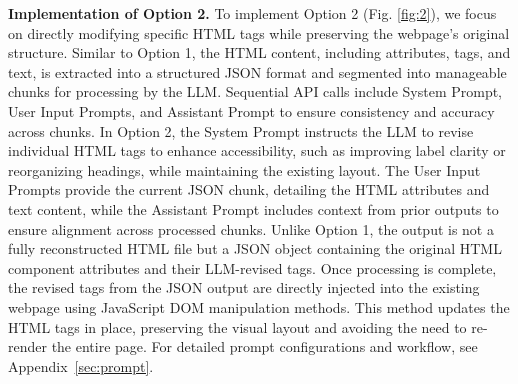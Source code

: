 \textbf{Implementation of Option 2.} To implement Option 2 (Fig. \ref{fig:2}), we focus on directly modifying specific HTML tags while preserving the webpage’s original structure. Similar to Option 1, the HTML content, including attributes, tags, and text, is extracted into a structured JSON format and segmented into manageable chunks for processing by the LLM. Sequential API calls include System Prompt, User Input Prompts, and Assistant Prompt to ensure consistency and accuracy across chunks. In Option 2, the System Prompt instructs the LLM to revise individual HTML tags to enhance accessibility, such as improving label clarity or reorganizing headings, while maintaining the existing layout. The User Input Prompts provide the current JSON chunk, detailing the HTML attributes and text content, while the Assistant Prompt includes context from prior outputs to ensure alignment across processed chunks. Unlike Option 1, the output is not a fully reconstructed HTML file but a JSON object containing the original HTML component attributes and their LLM-revised tags. Once processing is complete, the revised tags from the JSON output are directly injected into the existing webpage using JavaScript DOM manipulation methods. This method updates the HTML tags in place, preserving the visual layout and avoiding the need to re-render the entire page. For detailed prompt configurations and workflow, see Appendix~\ref{sec:prompt}.


